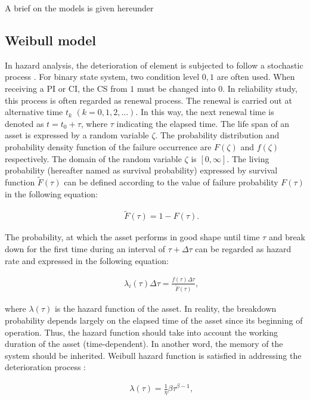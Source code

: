 \documentclass[fleqn]{article}
\begin{document}
A brief on the models is given hereunder


\subsection{Weibull model} \label{ch03:weibullmodel}

In hazard analysis, the deterioration of element is subjected to follow a stochastic process \cite{lancaster90}. For binary state system, two condition level $0, 1$ are often used. When receiving a PI or CI, the CS from $1$ must be changed into $0$. In reliability study, this process is often regarded as renewal process. The renewal is carried out at alternative time $t_k$ $(k=0,1,2,...)$. In this way, the next renewal time is denoted as $t=t_0+\tau$, where $\tau$ indicating the elapsed time. The life span of an asset is expressed by a random variable $\zeta$. The probability distribution and probability density function of the failure occurrence are $F(\zeta)$ and $f(\zeta)$ respectively. The domain of the random variable $\zeta$ is $[0,\infty]$. The living probability (hereafter named as survival probability) expressed by survival function $\tilde{F}(\tau)$ can be defined according to the value of failure probability $F(\tau)$ in the following equation:

\begin{eqnarray}
&& \tilde{F}(\tau) = 1 - F(\tau). \label{funcbF5}
\end{eqnarray}


The probability, at which the asset performs in good shape until time $\tau$ and break down for the first time during an interval of 
$\tau+\Delta\tau$ can be regarded as hazard rate and expressed in the following equation:

\begin{eqnarray}
&& \lambda_i(\tau) \Delta \tau = \frac{f(\tau)\Delta \tau}{\tilde{F}(\tau)}, \label{riskbF5}
\end{eqnarray}

where $\lambda(\tau)$ is the hazard function of the asset. In reality, the breakdown probability depends largely on the elapsed time of the asset since its beginning of operation. Thus, the hazard function should take into account the working duration of the asset (time-dependent). In another word, the memory of the system should be inherited. Weibull hazard function is satisfied in addressing the deterioration process \cite{Dodson2006, Kobayashi2010a}:

\begin{eqnarray}
&& \lambda(\tau)= \frac{1}{\eta} \beta \tau^{\beta-1}, \label{weibul}
\end{eqnarray}
\end{document}
